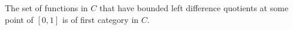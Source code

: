The set of functions in $C$ that have bounded left difference quotients at some point of $[0,1]$ is of first category in $C$.
